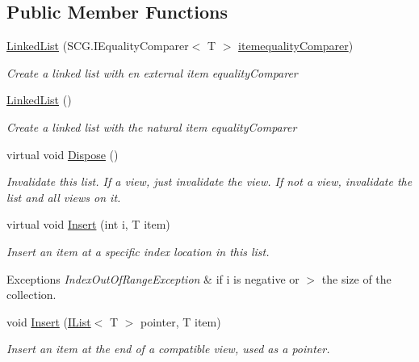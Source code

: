 \subsection*{Public Member Functions}
\begin{DoxyCompactItemize}
\item 
\hyperlink{class_c5_1_1_linked_list_a197887f705c1657502871cf996e81a8a}{Linked\+List} (S\+C\+G.\+I\+Equality\+Comparer$<$ T $>$ \hyperlink{class_c5_1_1_collection_base_a95e343400be0e8f3f8d6310f1aaf2cc6}{itemequality\+Comparer})
\begin{DoxyCompactList}\small\item\em Create a linked list with en external item equality\+Comparer \end{DoxyCompactList}\item 
\hyperlink{class_c5_1_1_linked_list_aa2ef8faceda19c5b875b01e4a49461a4}{Linked\+List} ()
\begin{DoxyCompactList}\small\item\em Create a linked list with the natural item equality\+Comparer \end{DoxyCompactList}\item 
virtual void \hyperlink{class_c5_1_1_linked_list_afa786e49824e4d1f9e2c139cc2cd336a}{Dispose} ()
\begin{DoxyCompactList}\small\item\em Invalidate this list. If a view, just invalidate the view. If not a view, invalidate the list and all views on it. \end{DoxyCompactList}\item 
virtual void \hyperlink{class_c5_1_1_linked_list_a4fd535e30e7a418ac82ce3b684e0782d}{Insert} (int i, T item)
\begin{DoxyCompactList}\small\item\em Insert an item at a specific index location in this list. 
\begin{DoxyExceptions}{Exceptions}
{\em Index\+Out\+Of\+Range\+Exception} & if i is negative or $>$ the size of the collection.\\
\hline
\end{DoxyExceptions}
\end{DoxyCompactList}\item 
void \hyperlink{class_c5_1_1_linked_list_a4b4a52f0c0f07eca6ccaa1ed627af6df}{Insert} (\hyperlink{interface_c5_1_1_i_list}{I\+List}$<$ T $>$ pointer, T item)
\begin{DoxyCompactList}\small\item\em Insert an item at the end of a compatible view, used as a pointer. \end{DoxyCompactList}\item 

\end{DoxyCompactItemize}
